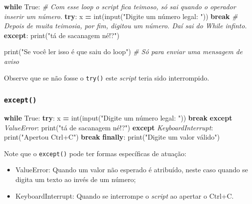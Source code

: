 \documentclass[]{book}
\newenvironment{Shaded}{\begin{snugshade}}{\end{snugshade}}
\newcommand{\StringTok}[1]{\textcolor[rgb]{0.31,0.60,0.02}{#1}}
\newcommand{\CommentTok}[1]{\textcolor[rgb]{0.56,0.35,0.01}{\textit{#1}}}
\newcommand{\VariableTok}[1]{\textcolor[rgb]{0.00,0.00,0.00}{#1}}
\newcommand{\ControlFlowTok}[1]{\textcolor[rgb]{0.13,0.29,0.53}{\textbf{#1}}}
\newcommand{\OperatorTok}[1]{\textcolor[rgb]{0.81,0.36,0.00}{\textbf{#1}}}
\newcommand{\BuiltInTok}[1]{#1}
\newcommand{\PreprocessorTok}[1]{\textcolor[rgb]{0.56,0.35,0.01}{\textit{#1}}}
\newcommand{\NormalTok}[1]{#1}
\providecommand{\tightlist}{%
  \setlength{\itemsep}{0pt}\setlength{\parskip}{0pt}}
\begin{document}
\begin{Shaded}
\begin{Highlighting}[]
\ControlFlowTok{while} \VariableTok{True}\NormalTok{:  }\CommentTok{# Com esse loop o script fica teimoso, só sai quando o operador inserir um número.}
    \ControlFlowTok{try}\NormalTok{:}
\NormalTok{        x }\OperatorTok{=} \BuiltInTok{int}\NormalTok{(}\BuiltInTok{input}\NormalTok{(}\StringTok{"Digite um número legal: "}\NormalTok{))}
        \ControlFlowTok{break} \CommentTok{# Depois de muita teimosia, por fim, digitou um número. Daí sai do While infinto.}
    \ControlFlowTok{except}\NormalTok{:}
        \BuiltInTok{print}\NormalTok{(}\StringTok{"tá de sacanagem né!?"}\NormalTok{)}

\BuiltInTok{print}\NormalTok{(}\StringTok{"Se você ler isso é que saiu do loop"}\NormalTok{) }\CommentTok{# Só para enviar uma mensagem de aviso}
\end{Highlighting}
\end{Shaded}

Observe que se não fosse o \texttt{try()} este \emph{script} teria sido
interrompido.

\subsubsection{\texorpdfstring{\texttt{except()}}{except()}}\label{except}

\begin{Shaded}
\begin{Highlighting}[]
\ControlFlowTok{while} \VariableTok{True}\NormalTok{:}
    \ControlFlowTok{try}\NormalTok{:}
\NormalTok{        x }\OperatorTok{=} \BuiltInTok{int}\NormalTok{(}\BuiltInTok{input}\NormalTok{(}\StringTok{"Digite um número legal: "}\NormalTok{))}
        \ControlFlowTok{break}
    \ControlFlowTok{except} \PreprocessorTok{ValueError}\NormalTok{:}
        \BuiltInTok{print}\NormalTok{(}\StringTok{"tá de sacanagem né!?"}\NormalTok{)}
      \ControlFlowTok{except} \PreprocessorTok{KeyboardInterrupt}\NormalTok{:}
        \BuiltInTok{print}\NormalTok{(}\StringTok{"Apertou Ctrl+C"}\NormalTok{)}
        \ControlFlowTok{break}
    \ControlFlowTok{finally}\NormalTok{:}
        \BuiltInTok{print}\NormalTok{(}\StringTok{"Digite um valor válido"}\NormalTok{)}
\end{Highlighting}
\end{Shaded}

Note que o \texttt{except()} pode ter formas específicas de atuação:

\begin{itemize}
\tightlist
\item
  ValueError: Quando um valor não esperado é atribuído, neste caso
  quando se digita um texto ao invés de um número;
\item
  KeyboardInterrupt: Quando se interrompe o \emph{script} ao apertar o
  Ctrl+C.
\end{itemize}
\end{document}
